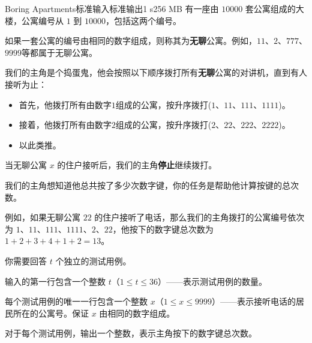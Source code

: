 \begin{problem}{Boring Apartments}{标准输入}{标准输出}{1 s}{256 MB}
有一座由 $10000$ 套公寓组成的大楼，公寓编号从 $1$ 到 $10000$，包括这两个编号。

如果一套公寓的编号由相同的数字组成，则称其为\textbf{无聊}公寓。例如，$11$、$2$、$777$、$9999$等都属于无聊公寓。

我们的主角是个捣蛋鬼，他会按照以下顺序拨打所有\textbf{无聊}公寓的对讲机，直到有人接听为止：

\begin{itemize}
\item 首先，他拨打所有由数字$1$组成的公寓，按升序拨打($1$、$11$、$111$、$1111$)。
\item 接着，他拨打所有由数字$2$组成的公寓，按升序拨打($2$、$22$、$222$、$2222$)。
\item 以此类推。
\end{itemize}

当无聊公寓 $x$ 的住户接听后，我们的主角\textbf{停止}继续拨打。

我们的主角想知道他总共按了多少次数字键，你的任务是帮助他计算按键的总次数。

例如，如果无聊公寓 $22$ 的住户接听了电话，那么我们的主角拨打的公寓编号依次为 $1$、$11$、$111$、$1111$、$2$、$22$，他按下的数字键总次数为 $1 + 2 + 3 + 4 + 1 + 2 = 13$。

你需要回答 $t$ 个独立的测试用例。

\InputFile
输入的第一行包含一个整数 $t$（$1 \le t \le 36$）——表示测试用例的数量。

每个测试用例的唯一一行包含一个整数 $x$（$1 \le x \le 9999$）——表示接听电话的居民所在的公寓号。保证 $x$ 由相同的数字组成。

\OutputFile
对于每个测试用例，输出一个整数，表示主角按下的数字键总次数。

\Example

\begin{example}
\end{example}
\end{problem}